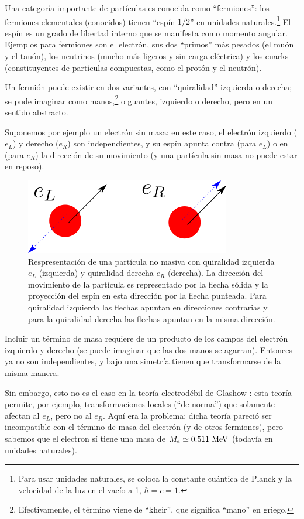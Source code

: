Una categor\'ia importante de part\'iculas es conocida como
``fermiones'': los fermiones elementales (conocidos) tienen
``esp\'in $1/2 $'' en unidades naturales.\footnote{Para
usar unidades naturales, se coloca la constante
cu\'antica de Planck y la velocidad de la luz en el vac\'io a 1,
$\hbar = c =1$.}
El esp\'in es un grado de libertad interno que se manifesta como
momento angular. Ejemplos para fermiones son el electr\'on, sus dos
``primos'' m\'as pesados (el mu\'on y el tau\'on), los neutrinos (mucho
m\'as ligeros y sin carga el\'ectrica) y los cuarks (constituyentes
de part\'iculas compuestas, como el prot\'on y el neutr\'on).

Un fermi\'on puede existir en dos variantes, con ``quiralidad''
izquierda o derecha; se pude imaginar como manos,\footnote{Efectivamente,
el t\'ermino viene de ``kheir'', que significa ``mano'' en griego.} 
o guantes, izquierdo o derecho, pero en un sentido abstracto.

Suponemos por ejemplo un electr\'{o}n sin masa: en este caso,
el electr\'on izquierdo ($e_L$) y derecho ($e_R$) son independientes,
y su esp\'in apunta contra (para $e_L$) o en (para $e_R$) la
direcci\'on de su movimiento (y una part\'icula sin masa no
puede estar en reposo).


\begin{figure}
\centering
\includegraphics[scale=1]{images/quiral.png}
\caption{Respresentaci\' on de una part\'icula no masiva con quiralidad izquierda $e_L$ (izquierda) y quiralidad derecha $e_R$ (derecha). La direcci\'on del movimiento de la part\'icula es representado por la flecha s\'olida y la proyecci\'on del esp\'in en esta direcci\'on por la flecha punteada. Para quiralidad izquierda las flechas apuntan en direcciones contrarias y para la quiralidad derecha las flechas apuntan en la misma direcci\'on.}
\end{figure}
Incluir un t\'ermino de masa requiere de un producto de los campos
del electr\'on izquierdo y derecho (se puede imaginar que las dos
manos se agarran). Entonces ya no son independientes, y bajo una
simetr\'ia tienen que transformarse de la misma manera.

Sin embargo, esto no es el caso en la teor\'ia electrod\'ebil de Glashow
\cite{Glashow}: esta teor\'ia permite, por ejemplo, transformaciones
locales (``de norma'') que solamente afectan al $e_L$, pero no al $e_R$.
Aqu\'i era la problema: dicha teor\'ia pareci\'o ser incompatible con
el t\'ermino de masa del electr\'on (y de otros fermiones), pero sabemos
que el electron s\'i tiene una masa de $M_e \simeq 0.511\ {\rm MeV}$
(todav\'ia en unidades naturales).

